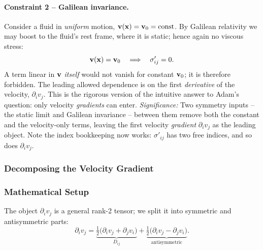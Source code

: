 \documentclass[../main.tex]{subfiles}
\begin{document}
\paragraph{Constraint 2 -- Galilean invariance.} Consider a fluid in \emph{uniform} motion, $\mathbf{v}(\mathbf{x})=\mathbf{v}_0=\text{const}$. By Galilean relativity we may boost to the fluid's rest frame, where it is static; hence again no viscous stress:
\begin{equation}
  \mathbf{v}(\mathbf{x})=\mathbf{v}_0 \quad\Longrightarrow\quad \sigma'_{ij}=0 .
  \label{eq:lec18_galilean}
\end{equation}
A term linear in $\mathbf{v}$ \emph{itself} would not vanish for constant $\mathbf{v}_0$; it is therefore forbidden. The leading allowed dependence is on the first \emph{derivative} of the velocity, $\partial_i v_j$. This is the rigorous version of the intuitive answer to Adam's question: only velocity \emph{gradients} can enter.
\textit{Significance:} Two symmetry inputs -- the static limit and Galilean invariance -- between them remove both the constant and the velocity-only terms, leaving the first velocity \emph{gradient} $\partial_i v_j$ as the leading object. Note the index bookkeeping now works: $\sigma'_{ij}$ has two free indices, and so does $\partial_i v_j$.

\subsubsection{Decomposing the Velocity Gradient}\label{sec:lec18:decomp}

\subsubsection*{Mathematical Setup}
The object $\partial_i v_j$ is a general rank-2 tensor; we split it into symmetric and antisymmetric parts:
\begin{equation}
  \partial_i v_j = \underbrace{\tfrac{1}{2}\big(\partial_i v_j + \partial_j v_i\big)}_{\displaystyle D_{ij}}
                 + \underbrace{\tfrac{1}{2}\big(\partial_i v_j - \partial_j v_i\big)}_{\text{antisymmetric}} .
  \label{eq:lec18_gradv_split}
\end{equation}
\end{document}
